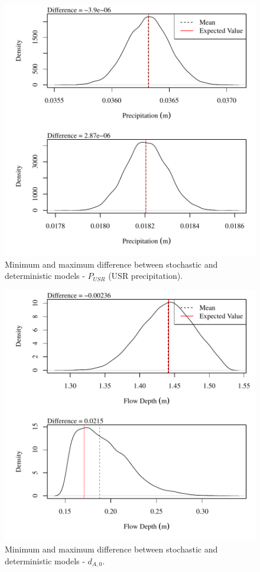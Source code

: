 \begin{center}
\begin{figure}[htbp]
	\includegraphics[width=6in]{"Figures/Results_USR/V min-max diff p"}
	\caption{Minimum and maximum difference between stochastic and deterministic models - $P_{USR}$ (USR precipitation).}
\end{figure}
\end{center}
\newpage

\begin{center}
\begin{figure}[htbp]
	\includegraphics[width=6in]{"Figures/Results_USR/V min-max diff depthA1"}
	\caption{Minimum and maximum difference between stochastic and deterministic models - $d_{A,0}$.}
\end{figure}
\end{center}
\newpage

